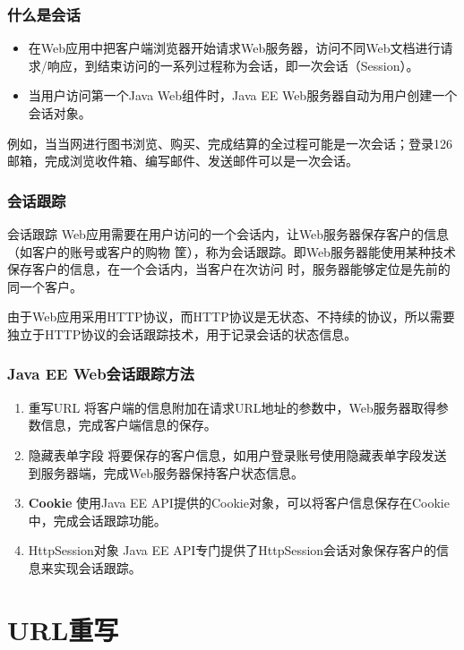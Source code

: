 \begin{frame}
\frametitle{什么是会话} 
\begin{itemize}
\item 在Web应用中把客户端浏览器开始请求Web服务器，访问不同Web文档进行请求/响应，到结束访问的一系列过程称为会话，即一次会话（Session）。
\item 当用户访问第一个Java Web组件时，Java EE Web服务器自动为用户创建一个会话对象。
\end{itemize}

{\kai 例如，当当网进行图书浏览、购买、完成结算的全过程可能是一次会话；登录126邮箱，完成浏览收件箱、编写邮件、发送邮件可以是一次会话。}
\end{frame}

\begin{frame}[fragile] %
\frametitle{会话跟踪} 

\begin{block}{会话跟踪}
Web应用需要在用户访问的一个会话内，让Web服务器保存客户的信息（如客户的账号或客户的购物
筐），称为会话跟踪。即Web服务器能使用某种技术保存客户的信息，在一个会话内，当客户在次访问
时，服务器能够定位是先前的同一个客户。
\end{block}

{\kai\Blue 由于Web应用采用HTTP协议，而HTTP协议是无状态、不持续的协议，所以需要独立于HTTP协议的会话跟踪技术，用于记录会话的状态信息。}
\end{frame}

\begin{frame}[fragile] %
\frametitle{Java EE Web会话跟踪方法} 

\begin{enumerate}\kai
\item {\hei\Red 重写URL} 将客户端的信息附加在请求URL地址的参数中，Web服务器取得参数信息，完成客户端信息的保存。
\item {\hei\Red 隐藏表单字段} 将要保存的客户信息，如用户登录账号使用隐藏表单字段发送到服务器端，完成Web服务器保持客户状态信息。
\item {\bf\Red Cookie} 使用Java EE API提供的Cookie对象，可以将客户信息保存在Cookie中，完成会话跟踪功能。
\item {\hei\Red HttpSession对象} Java EE API专门提供了HttpSession会话对象保存客户的信息来实现会话跟踪。 
\end{enumerate}
\end{frame}

\section{URL重写}


